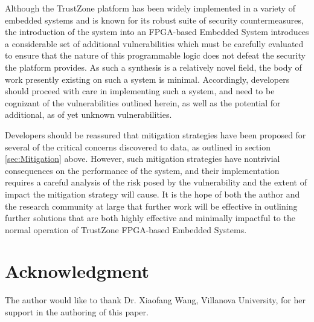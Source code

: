 \documentclass[journal]{IEEEtran}
\begin{document}
Although the TrustZone platform has been widely implemented in a variety of embedded
systems and is known for its robust suite of security countermeasures, the introduction of
the system into an FPGA-based Embedded System introduces a considerable set of additional
vulnerabilities which must be carefully evaluated to ensure that the nature of this
programmable logic does not defeat the security the platform provides. As such a synthesis
is a relatively novel field, the body of work presently existing on such a system is
minimal. Accordingly, developers should proceed with care in implementing such a system,
and need to be cognizant of the vulnerabilities outlined herein, as well as the potential
for additional, as of yet unknown vulnerabilities.

Developers should be reassured that mitigation strategies have been proposed for several
of the critical concerns discovered to data, as outlined in section \ref{sec:Mitigation}
above. However, such mitigation strategies have nontrivial consequences on the performance
of the system, and their implementation requires a careful analysis of the risk posed by 
the vulnerability and the extent of impact the mitigation strategy will cause. It is the 
hope of both the author and the research community at large that further work will be 
effective in outlining further solutions that are both highly effective and minimally 
impactful to the normal operation of TrustZone FPGA-based Embedded Systems.

\section*{Acknowledgment}
The author would like to thank Dr. Xiaofang Wang, Villanova University, for her support in
the authoring of this paper.




\end{document}
